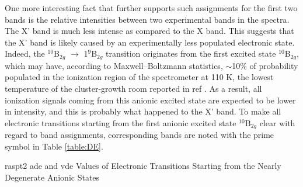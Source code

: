 \begin{refsection}
One more interesting fact that further supports such assignments for the first two bands is the relative intensities between two experimental bands in the spectra. The X' band is much less intense as compared to the X band. This suggests that the X' band is likely caused by an experimentally less populated electronic state. Indeed, the $^{10}$B$_{2g}$ $\longrightarrow$ 1$^9$B$_{2g}$ transition originates from the first excited state $^{10}$B$_{2g}$, which may have, according to Maxwell–Boltzmann statistics, $\sim$10\% of probability populated in the ionization region of the spectrometer at 110 K, \cite{Tono2003B} the lowest temperature of the cluster-growth room reported in ref . As a result, all ionization signals coming from this anionic excited state are expected to be lower in intensity, and this is probably what happened to the X' band. To make all electronic transitions starting from the first anionic excited state $^{10}$B$_{2g}$ clear with regard to band assignments, corresponding bands are noted with the prime symbol in Table \ref{table:DE}.    




\begin{table}[htbp!]
	\centering
	\begin{threeparttable}
	\caption{\acrshort{raspt2} \acrshort{ade} and \acrshort{vde} Values of Electronic Transitions Starting from the Nearly Degenerate Anionic States}
	\label{table:DE}


\end{threeparttable}
\end{table}
\end{refsection}
